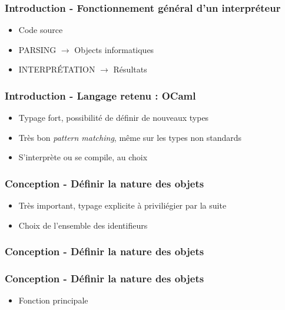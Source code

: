 \documentclass{beamer}
\begin{document}
\begin{frame}
\frametitle{Introduction - Fonctionnement général d'un interpréteur}
\begin{itemize}
\item Code source
\item PARSING $\longrightarrow$ Objects informatiques
\item INTERPRÉTATION $\longrightarrow$ Résultats
\end{itemize}
\end{frame}

\begin{frame}
\frametitle{Introduction - Langage retenu : OCaml}
\begin{itemize}
\item Typage fort, possibilité de définir de nouveaux types
\item Très bon {\it pattern matching}, même sur les types non standards
\item S'interprète ou se compile, au choix
\end{itemize}
\end{frame}

\begin{frame}[fragile]
\frametitle{Conception - Définir la nature des objets}
\begin{itemize}
\item Très important, typage explicite à priviliégier par la suite
\item Choix de l'ensemble des identifieurs
\end{itemize}
\begin{scriptsize}

\end{scriptsize}
\end{frame}
\begin{frame}[fragile]
\frametitle{Conception - Définir la nature des objets}
\begin{scriptsize}

\end{scriptsize}
\end{frame}
\begin{frame}[fragile]
\frametitle{Conception - Définir la nature des objets}
\begin{itemize}
\item Fonction principale
\end{itemize}
\begin{scriptsize}

\end{scriptsize}
\end{frame}
\end{document}
